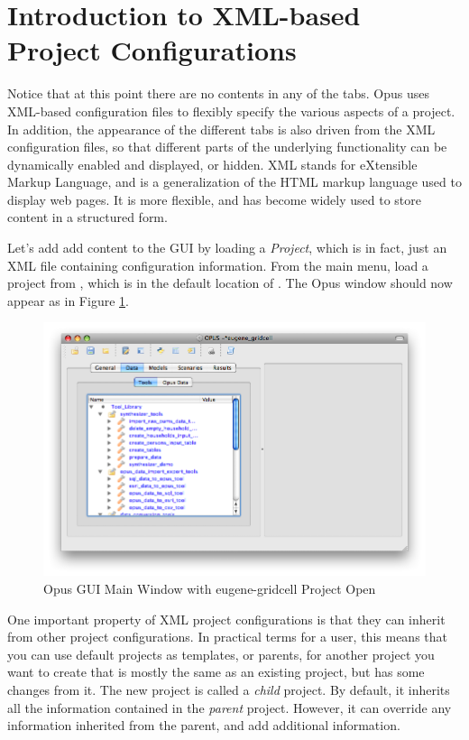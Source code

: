 \section{Introduction to XML-based Project Configurations}
\label{sec:intro-to-xml-based-project-configurations}

Notice that at this point there are no contents in any of the tabs.
Opus uses XML-based configuration files to flexibly specify the various
aspects of a project.  In addition, the appearance of the different tabs is
also driven from the XML configuration files, so that different parts of
the underlying functionality can be dynamically enabled and displayed, or
hidden.  XML stands for eXtensible Markup Language, and is a generalization
of the HTML markup language used to display web pages.  It is more
flexible, and has become widely used to store content in a structured form.

Let's add add content to the GUI by loading a \emph{Project}, which is in
fact, just an XML file containing configuration information.  From the main
menu, load a project from , which is in the
default location of .  The Opus window should
now appear as in Figure \ref{fig:opus2}.

\begin{figure}[htp]
\begin{center}
\includegraphics[scale=0.52]{part-gui/images/opus-open-project.png}
\end{center}
\caption{Opus GUI Main Window with eugene-gridcell Project Open}
\label{fig:opus2}
\end{figure}

One important property of XML project configurations is that they can
inherit from other project configurations.  In practical terms for a user,
this means that you can use default projects as templates, or parents, for
another project you want to create that is mostly the same as an existing
project, but has some changes from it.  The new project is called a
\emph{child} project.  By default, it inherits all the information
contained in the \emph{parent} project.  However, it can override any
information inherited from the parent, and add additional information.

